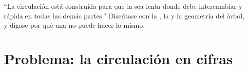 \begin{exercise}[$\star\star\star$]\label{exo:b2:blood-circulation:12}
``La circulación está construida para que la  sea lenta donde debe
intercambiar y rápida en todas las demás partes.'' Discútase con la
, la  y la geometría del árbol, y
dígase por qué una  no puede hacer lo mismo.
\end{exercise}

\section{Problema: la circulación en cifras}

